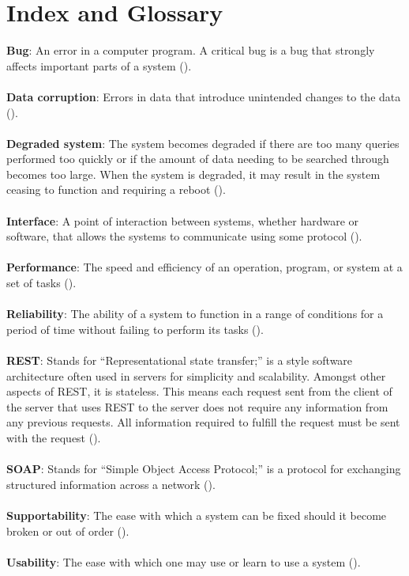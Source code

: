 \documentclass{article}
\begin{document}
\section{Index and Glossary}
\textbf{Bug}: An error in a computer program. A critical bug is a bug that strongly affects important parts of a system (\pageref{bug}).\\ \\
\textbf{Data corruption}: Errors in data that introduce unintended changes to the data (\pageref{data_corruption}).\\ \\
\textbf{Degraded system}: The system becomes degraded if there are too many queries performed too quickly or if the amount of data needing to be searched through becomes too large. When the system is degraded, it may result in the system ceasing to function and requiring a reboot (\pageref{degrad_sys}).\\ \\
\textbf{Interface}: A point of interaction between systems, whether hardware or software, that allows the systems to communicate using some protocol (\pageref{interface}).\\ \\
\textbf{Performance}: The speed and efficiency of an operation, program, or system at a set of tasks (\pageref{performance}).\\ \\
\textbf{Reliability}: The ability of a system to function in a range of conditions for a period of time without failing to perform its tasks (\pageref{reliability}).\\ \\
\textbf{REST}: Stands for ``Representational state transfer;'' is a style software architecture often used in servers for simplicity and scalability. Amongst other aspects of REST, it is stateless. This means each request sent from the client of the server that uses REST to the server does not require any information from any previous requests. All information required to fulfill the request must be sent with the request (\pageref{rest}).\\ \\
\textbf{SOAP}: Stands for ``Simple Object Access Protocol;'' is a protocol for exchanging structured information across a network (\pageref{soap}).\\ \\
\textbf{Supportability}: The ease with which a system can be fixed should it become broken or out of order (\pageref{support}).\\ \\
\textbf{Usability}: The ease with which one may use or learn to use a system (\pageref{usability}).
\end{document}

